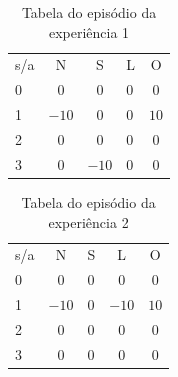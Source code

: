\documentclass[12pt,letterpaper]{article}
\begin{document}
	\begin{table}[]
		\centering
		\caption{Tabela do episódio da experiência 1}
		\label{my-label}
		\begin{tabular}{|l|l|l|l|l|}
			\cline{1-5}
			s/a  & \multicolumn{1}{|c|}{N}     & \multicolumn{1}{|c|}{S}       & L   & \multicolumn{1}{|c|}{O}     \\ \cline{1-5}
			0    & \multicolumn{1}{|c|}{$0$}   & \multicolumn{1}{|c|}{$0$}     & $0$ & \multicolumn{1}{|c|}{$0$}   \\ \cline{1-5}
			1    & \multicolumn{1}{|c|}{$-10$} & \multicolumn{1}{|c|}{$0$}     & $0$ & \multicolumn{1}{|c|}{$10$}  \\ \cline{1-5}
			2    & \multicolumn{1}{|c|}{$0$}   & \multicolumn{1}{|c|}{$0$}     & $0$ & \multicolumn{1}{|c|}{$0$}   \\ \cline{1-5}
			3    & \multicolumn{1}{|c|}{$0$}   & \multicolumn{1}{|c|}{$-10$}   & $0$ & \multicolumn{1}{|c|}{$0$}   \\ \cline{1-5}
		\end{tabular}
	\end{table}

	\begin{table}[]
		\centering
		\caption{Tabela do episódio da experiência 2}
		\label{my-label}
		\begin{tabular}{|l|l|l|l|l|}
			\cline{1-5}
			s/a  & \multicolumn{1}{|c|}{N}     & S       & \multicolumn{1}{|c|}{L}   & \multicolumn{1}{|c|}{O}     \\ \cline{1-5}
			0    & \multicolumn{1}{|c|}{$0$}   & $0$   & \multicolumn{1}{|c|}{$0$}   & \multicolumn{1}{|c|}{$0$}   \\ \cline{1-5}
			1    & \multicolumn{1}{|c|}{$-10$} & $0$   & \multicolumn{1}{|c|}{$-10$} & \multicolumn{1}{|c|}{$10$}  \\ \cline{1-5}
			2    & \multicolumn{1}{|c|}{$0$}   & $0$   & \multicolumn{1}{|c|}{$0$}   & \multicolumn{1}{|c|}{$0$}   \\ \cline{1-5}
			3    & \multicolumn{1}{|c|}{$0$}   & $0$   & \multicolumn{1}{|c|}{$0$}   & \multicolumn{1}{|c|}{$0$}   \\ \cline{1-5}
		\end{tabular}
	\end{table}
\end{document}
